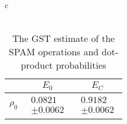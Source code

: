 \documentclass{beamer}
\begin{document}
\begin{frame}
\begin{table}[h]
\begin{center}
{\begin{tabular}{c}
\\
\vspace{2em}
\\
\begin{tabular}[l]{|c|c|c|}
\hline
 & $E_{0}$ & $E_C$ \\ \hline
$\rho_{0}$ & $ \begin{array}{c} 0.0821 \\ \pm 0.0062 \end{array} $ & $ \begin{array}{c} 0.9182 \\ \pm 0.0062 \end{array} $ \\ \hline
\end{tabular}

\end{tabular}
}
\caption{The GST estimate of the SPAM operations and dot-product probabilities}
\end{center}
\end{table}

\end{frame}
\end{document}
